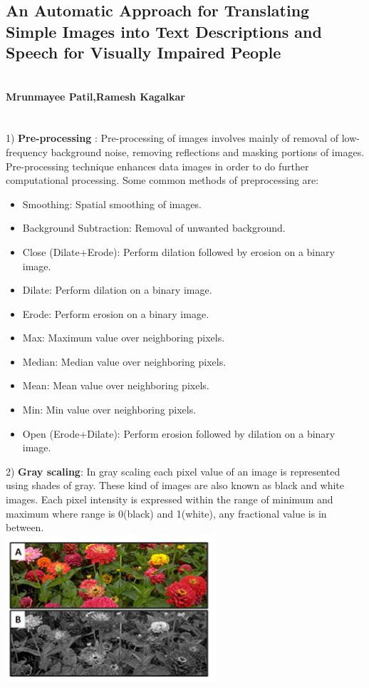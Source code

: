 \documentclass{article}
\begin{document}
\subsection{An Automatic Approach for Translating Simple Images
into Text Descriptions and Speech for Visually Impaired
People}
\textbf{\small \\Mrunmayee Patil,Ramesh Kagalkar}
\\\\\\
1) \textbf{Pre-processing} : Pre-processing of images involves mainly
of removal of low-frequency background noise, removing
reflections and masking portions of images. Pre-processing
technique enhances data images in order to do further
computational processing. Some common methods of preprocessing
are:
	\begin{itemize}
	\item Smoothing: Spatial smoothing of images. 
	\item Background Subtraction: Removal of unwanted background. 
	\item Close (Dilate+Erode): Perform dilation followed by erosion on
a binary image. 
	\item Dilate: Perform dilation on a binary image. 
	\item Erode: Perform erosion on a binary image. 
	\item Max: Maximum value over neighboring pixels. 
	\item Median: Median value over neighboring pixels. 
	\item Mean: Mean value over neighboring pixels. 
	\item Min: Min value over neighboring pixels. 
	\item Open (Erode+Dilate): Perform erosion followed by dilation on
a binary image. 
	\end{itemize}
2) \textbf{Gray scaling}: In gray scaling each pixel value of an image
is represented using shades of gray. These kind of images are
also known as black and white images. Each pixel intensity is
expressed within the range of minimum and maximum where
range is 0(black) and 1(white), any fractional value is in
between.\\
\includegraphics[scale=.5]{grey}\\\\
\end{document}
